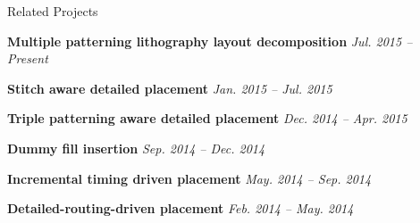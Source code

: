
\begin{rSection}{Related Projects}


{\bf Multiple patterning lithography layout decomposition }
\hfill{\em Jul. 2015 -- Present} 

{\bf Stitch aware detailed placement }
\hfill{\em Jan. 2015 -- Jul. 2015} 

{\bf Triple patterning aware detailed placement }
\hfill{\em Dec. 2014 -- Apr. 2015}

{\bf Dummy fill insertion }
\hfill{\em Sep. 2014 -- Dec. 2014}

{\bf Incremental timing driven placement }
\hfill{\em May. 2014 -- Sep. 2014} 

{\bf Detailed-routing-driven placement  }
\hfill{\em Feb. 2014 -- May. 2014}

\end{rSection}
